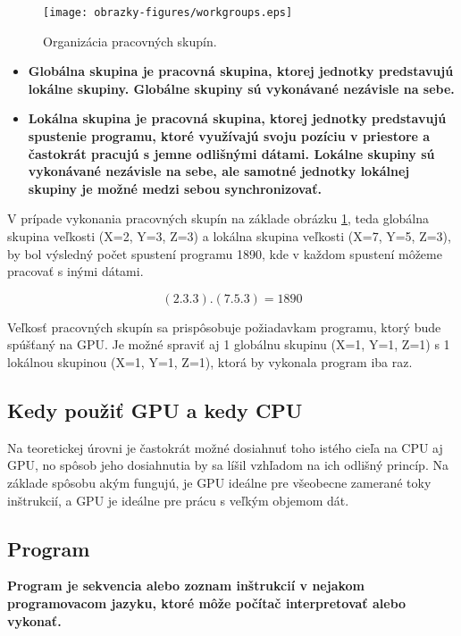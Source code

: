 \begin{figure}[H]
	\centering
	\texttt{[image: obrazky-figures/workgroups.eps]}
	\caption{Organizácia pracovných skupín.}
	\label{workgroups}
\end{figure}

\begin{itemize}
  \item{\bf Globálna skupina \rm je pracovná skupina, ktorej jednotky predstavujú lokálne skupiny. Globálne skupiny sú vykonávané nezávisle na sebe.}
  \item{\bf Lokálna skupina \rm je pracovná skupina, ktorej jednotky predstavujú spustenie programu, ktoré využívajú svoju pozíciu v priestore a častokrát pracujú s jemne odlišnými dátami. Lokálne skupiny sú vykonávané nezávisle na sebe, ale samotné jednotky lokálnej skupiny je možné medzi sebou synchronizovať.}
\end{itemize}

V prípade vykonania pracovných skupín na základe obrázku \ref{workgroups}, teda globálna skupina veľkosti (X=2, Y=3, Z=3) a lokálna skupina veľkosti (X=7, Y=5, Z=3), by bol výsledný počet spustení programu 1890, kde v každom spustení môžeme pracovať s inými dátami.

\begin{equation}
	(2.3.3) . (7.5.3) = 1890
	\label{eq:workgroupeq}
\end{equation}

Veľkosť pracovných skupín sa prispôsobuje požiadavkam programu, ktorý bude spúšťaný na GPU. Je možné spraviť aj 1 globálnu skupinu (X=1, Y=1, Z=1) s 1 lokálnou skupinou (X=1, Y=1, Z=1), ktorá by vykonala program iba raz.

\subsection*{Kedy použiť GPU a kedy CPU}
Na teoretickej úrovni je častokrát možné dosiahnuť toho istého cieľa na CPU aj GPU, no spôsob jeho dosiahnutia by sa líšil vzhľadom na ich odlišný princíp. Na základe spôsobu akým fungujú, je GPU ideálne pre všeobecne zamerané toky inštrukcií, a GPU je ideálne pre prácu s veľkým objemom dát. 

\subsection{Program}

\bf Program \rm je sekvencia alebo zoznam inštrukcií v nejakom programovacom jazyku, ktoré môže počítač interpretovať alebo vykonať.

